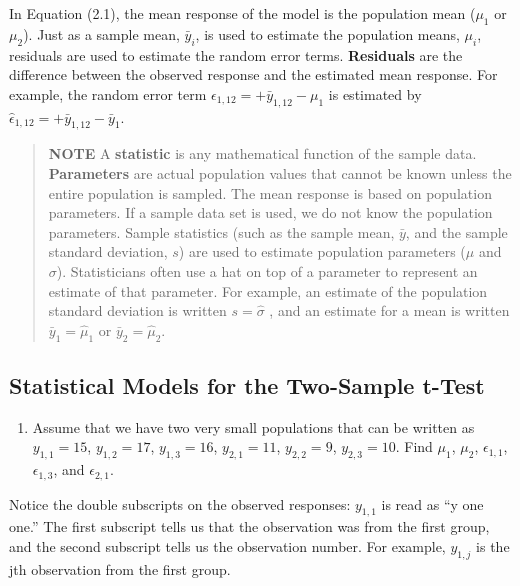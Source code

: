 \documentclass[
]{report}
\providecommand{\tightlist}{%
  \setlength{\itemsep}{0pt}\setlength{\parskip}{0pt}}
\theoremstyle{definition}
\theoremstyle{definition}
\theoremstyle{definition}
\theoremstyle{definition}
\theoremstyle{remark}
\begin{document}
In Equation (2.1), the mean response of the model is the population mean (\(\mu_1\) or \(\mu_2\)). Just as a sample mean, \(\bar{y}_i\), is used to estimate the population means, \(\mu_i\), residuals are used to estimate the random error terms. \textbf{Residuals} are the difference between the observed response and the estimated mean response. For example, the random error term \(\epsilon_{1, 12} = + \bar{y}_{1, 12} - \mu_1\) is estimated by \(\hat{\epsilon}_{1, 12} = + \bar{y}_{1, 12} - \bar{y}_1\).

\begin{quote}
\textbf{NOTE}
A \textbf{statistic} is any mathematical function of the sample data. \textbf{Parameters} are actual population values that cannot be known unless the entire population is sampled. The mean response is based on population parameters. If a sample data set is used, we do not know the population parameters. Sample statistics (such as the sample mean, \(\bar{y}\), and the sample standard deviation, \(s\)) are used to estimate population parameters (\(\mu\) and \(\sigma\)). Statisticians often use a hat on top of a parameter to represent an estimate of that parameter. For example, an estimate of the population standard deviation is written \(s = \hat{\sigma}\) , and an estimate for a mean is written \(\bar{y}_1 = \hat{\mu}_1\) or \(\bar{y}_2 = \hat{\mu}_2\).
\end{quote}

\hypertarget{statistical-models-for-the-two-sample-t-test}{%
\subsection{Statistical Models for the Two-Sample t-Test}\label{statistical-models-for-the-two-sample-t-test}}

\begin{enumerate}
\def\labelenumi{\arabic{enumi}.}
\setcounter{enumi}{4}
\tightlist
\item
  Assume that we have two very small populations that can be written as
  \(y_{1,1} = 15\), \(y_{1,2} = 17\), \(y_{1,3} = 16\), \(y_{2,1} = 11\), \(y_{2,2} = 9\), \(y_{2,3} = 10\). Find \(\mu_1\), \(\mu_2\), \(\epsilon_{1, 1}\), \(\epsilon_{1, 3}\), and \(\epsilon_{2, 1}\).
\end{enumerate}

Notice the double subscripts on the observed responses: \(y_{1,1}\) is read as ``y one one.'' The first subscript tells us that the observation was from the first group, and the second subscript tells us the observation number. For example, \(y_{1,j}\) is the jth observation from the first group.
\end{document}
